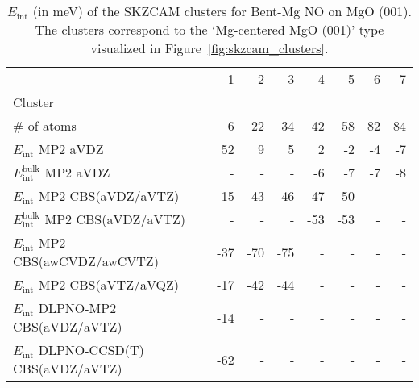 \begin{table}
\caption{\label{tab:system_eint_mgo_no_bent-mg}$E_\textrm{int}$ (in meV) of the SKZCAM clusters for Bent-Mg NO on MgO (001). The clusters correspond to the `Mg-centered MgO (001)' type visualized in Figure~\ref{fig:skzcam_clusters}.}
\begin{adjustbox}{center,max width=1.4\textwidth}
\begin{tabular}{lrrrrrrr}
\toprule
 & 1 & 2 & 3 & 4 & 5 & 6 & 7 \\ 
Cluster &  &  &  &  &  &  &  \\
\midrule
\# of atoms & 6 & 22 & 34 & 42 & 58 & 82 & 84 \\
$E_\textrm{int}$ MP2 aVDZ & 52 & 9 & 5 & 2 & -2 & -4 & -7 \\
$E_\textrm{int}^\textrm{bulk}$ MP2 aVDZ & - & - & - & -6 & -7 & -7 & -8 \\
$E_\textrm{int}$ MP2 CBS(aVDZ/aVTZ) & -15 & -43 & -46 & -47 & -50 & - & - \\
$E_\textrm{int}^\textrm{bulk}$ MP2 CBS(aVDZ/aVTZ) & - & - & - & -53 & -53 & - & - \\
$E_\textrm{int}$ MP2 CBS(awCVDZ/awCVTZ) & -37 & -70 & -75 & - & - & - & - \\
$E_\textrm{int}$ MP2 CBS(aVTZ/aVQZ) & -17 & -42 & -44 & - & - & - & - \\
$E_\textrm{int}$ DLPNO-MP2 CBS(aVDZ/aVTZ) & -14 & - & - & - & - & - & - \\
$E_\textrm{int}$ DLPNO-CCSD(T) CBS(aVDZ/aVTZ) & -62 & - & - & - & - & - & - \\
\bottomrule
\end{tabular}
\end{adjustbox}
\end{table}


